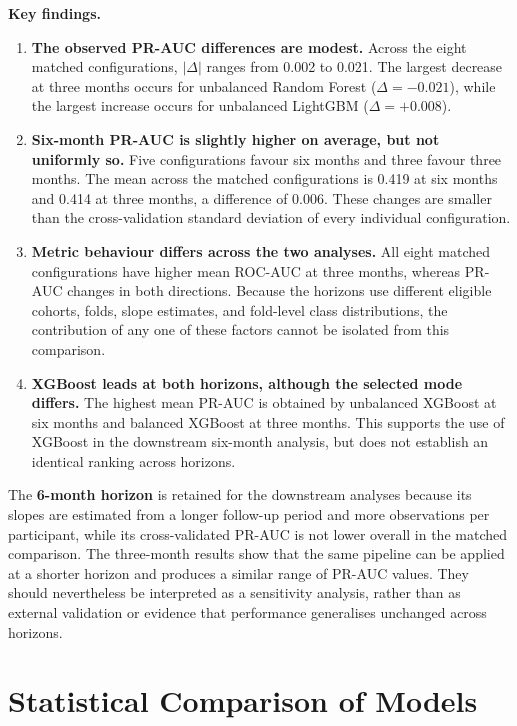 \noindent\textbf{Key findings.}
\begin{enumerate}
  \item \textbf{The observed PR-AUC differences are modest.}
    Across the eight matched configurations, $|\Delta|$ ranges from 0.002 to 0.021. The largest decrease at three months occurs for unbalanced Random Forest ($\Delta=-0.021$), while the largest increase occurs for unbalanced LightGBM ($\Delta=+0.008$).
  \item \textbf{Six-month PR-AUC is slightly higher on average, but not uniformly so.}
    Five configurations favour six months and three favour three months. The mean across the matched configurations is 0.419 at six months and 0.414 at three months, a difference of 0.006. These changes are smaller than the cross-validation standard deviation of every individual configuration.
  \item \textbf{Metric behaviour differs across the two analyses.}
    All eight matched configurations have higher mean ROC-AUC at three months, whereas PR-AUC changes in both directions. Because the horizons use different eligible cohorts, folds, slope estimates, and fold-level class distributions, the contribution of any one of these factors cannot be isolated from this comparison.
  \item \textbf{XGBoost leads at both horizons, although the selected mode differs.}
    The highest mean PR-AUC is obtained by unbalanced XGBoost at six months and balanced XGBoost at three months. This supports the use of XGBoost in the downstream six-month analysis, but does not establish an identical ranking across horizons.
\end{enumerate}

The \textbf{6-month horizon} is retained for the downstream analyses because its slopes are estimated from a longer follow-up period and more observations per participant, while its cross-validated PR-AUC is not lower overall in the matched comparison. The three-month results show that the same pipeline can be applied at a shorter horizon and produces a similar range of PR-AUC values. They should nevertheless be interpreted as a sensitivity analysis, rather than as external validation or evidence that performance generalises unchanged across horizons.


\section{Statistical Comparison of Models}
\label{sec:results_statistical_comparison}

